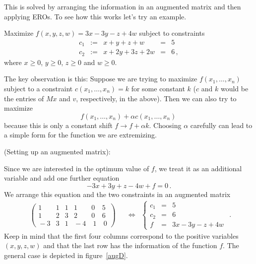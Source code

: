 This is solved by arranging the information in an augmented matrix and then applying EROs.
To see how this works let's try an example.

\begin{example}\label{stdprob}
Maximize $f(x,y,z,w)=3x-3y-z+4w$ subject to constraints
\begin{equation*}
\begin{array}{rcccl}
c_1&:=&x+y+z+w&=&5\\[2mm]
c_2&:=&x+2y+3z+2w&=&6\, ,
\end{array}
\end{equation*}
where $x\geq0$, $y\geq0$, $z\geq0$ and $w\geq 0$.
\end{example}
  The key observation is this: Suppose we are trying to maximize $f(x_1,\ldots,x_n)$ subject to 
  a constraint $c(x_1,\ldots,x_n)=k$ for some constant $k$ ($c$ and $k$ would  be the entries of 
  $Mx$ and $v$, respectively, in the above). Then we can also try to maximize
  \[
 f(x_1,\ldots,x_n)+\alpha c(x_1,\ldots,x_n)\, 
  \]
  because this is only a constant shift $f\to f+\alpha k$. Choosing $\alpha$ carefully can lead to a simple form for the function we are extremizing.



\begin{example} (Setting up an augmented matrix):

Since we are interested in the optimum value of $f$, we treat it as an additional variable and add one further equation
\[
-3x+3y+z-4w+f=0\, .
\]
We arrange this equation and the two constraints in an augmented matrix
\[
\begin{array}{ccc}
\left(\begin{array}{rrrrr|r}
1&1&1&1&0&5\\[1mm]
1&2&3&2&0&6\\\hline
\!-3&3&1&\!\!-4&\ 1&\ 0
\end{array}\right)
\quad &\Leftrightarrow &%
\left\{
\begin{array}{lcl}
c_1&=&5\\[1mm]
c_2&=&6\\[1mm]
f&=&3x-3y-z+4w
\end{array}\right.
\end{array}.
\]
Keep in mind that the first four columns correspond to the positive variables $(x,y,z,w)$ and that
the last row has the information of the function $f$. The general case is depicted in figure~\ref{augD}.
\end{example}

